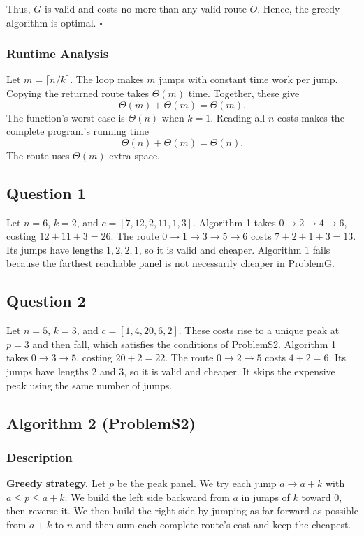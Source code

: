\documentclass{article}
\begin{document}
Thus, $G$ is valid and costs no more than any valid route $O$. Hence, the greedy algorithm is optimal. \hfill$\square$

\subsubsection{Runtime Analysis}

Let $m=\lceil n/k\rceil$. The loop makes $m$ jumps with constant time work per jump. Copying the returned route takes $\Theta(m)$ time. Together, these give
\[
\Theta(m)+\Theta(m)=\Theta(m).
\]
The function's worst case is $\Theta(n)$ when $k=1$. Reading all $n$ costs makes the complete program's running time
\[
\Theta(n)+\Theta(m)=\Theta(n).
\]
The route uses $\Theta(m)$ extra space.

\subsection{Question 1}

Let $n=6$, $k=2$, and $c=[7,12,2,11,1,3]$. Algorithm 1 takes $0\to2\to4\to6$, costing $12+11+3=26$. The route $0\to1\to3\to5\to6$ costs $7+2+1+3=13$. Its jumps have lengths $1,2,2,1$, so it is valid and cheaper. Algorithm 1 fails because the farthest reachable panel is not necessarily cheaper in ProblemG.

\subsection{Question 2}

Let $n=5$, $k=3$, and $c=[1,4,20,6,2]$. These costs rise to a unique peak at $p=3$ and then fall, which satisfies the conditions of ProblemS2. Algorithm 1 takes $0\to3\to5$, costing $20+2=22$. The route $0\to2\to5$ costs $4+2=6$. Its jumps have lengths $2$ and $3$, so it is valid and cheaper. It skips the expensive peak using the same number of jumps.

\subsection{Algorithm 2 (ProblemS2)}

\subsubsection{Description}

\noindent\textbf{Greedy strategy.} Let $p$ be the peak panel. We try each jump $a\to a+k$ with $a\le p\le a+k$. We build the left side backward from $a$ in jumps of $k$ toward $0$, then reverse it. We then build the right side by jumping as far forward as possible from $a+k$ to $n$ and then sum each complete route's cost and keep the cheapest.
\end{document}
